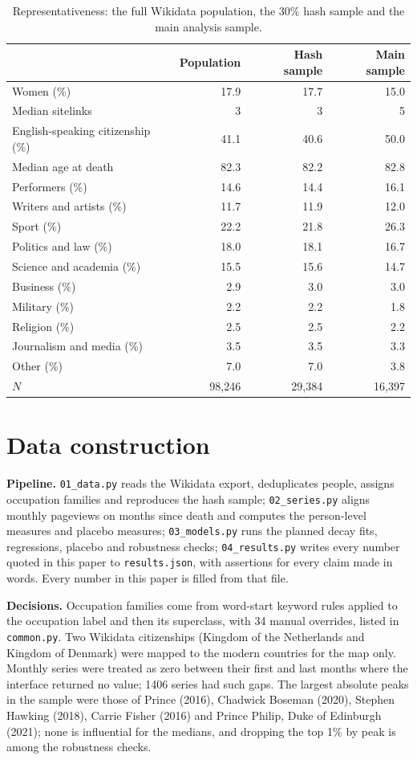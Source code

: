 \documentclass[11pt,a4paper]{article}
\begin{document}
\begin{table}[tbp]\centering\small\caption{Representativeness: the full Wikidata population, the 30\% hash sample and the main analysis sample.}\label{tab:rep}\begin{tabular}{lrrr}\toprule & Population & Hash sample & Main sample\\\midrule
Women (\%) & 17.9 & 17.7 & 15.0\\
Median sitelinks & 3 & 3 & 5\\
English-speaking citizenship (\%) & 41.1 & 40.6 & 50.0\\
Median age at death & 82.3 & 82.2 & 82.8\\
Performers (\%) & 14.6 & 14.4 & 16.1\\
Writers and artists (\%) & 11.7 & 11.9 & 12.0\\
Sport (\%) & 22.2 & 21.8 & 26.3\\
Politics and law (\%) & 18.0 & 18.1 & 16.7\\
Science and academia (\%) & 15.5 & 15.6 & 14.7\\
Business (\%) & 2.9 & 3.0 & 3.0\\
Military (\%) & 2.2 & 2.2 & 1.8\\
Religion (\%) & 2.5 & 2.5 & 2.2\\
Journalism and media (\%) & 3.5 & 3.5 & 3.3\\
Other (\%) & 7.0 & 7.0 & 3.8\\
$N$ & 98,246 & 29,384 & 16,397\\
\bottomrule\end{tabular}\end{table}

\section{Data construction}
\textbf{Pipeline.} \texttt{01\_data.py} reads the Wikidata export, deduplicates people, assigns occupation families and reproduces the hash sample; \texttt{02\_series.py} aligns monthly pageviews on months since death and computes the person-level measures and placebo measures; \texttt{03\_models.py} runs the planned decay fits, regressions, placebo and robustness checks; \texttt{04\_results.py} writes every number quoted in this paper to \texttt{results.json}, with assertions for every claim made in words. Every number in this paper is filled from that file.

\textbf{Decisions.} Occupation families come from word-start keyword rules applied to the occupation label and then its superclass, with 34 manual overrides, listed in \texttt{common.py}. Two Wikidata citizenships (Kingdom of the Netherlands and Kingdom of Denmark) were mapped to the modern countries for the map only. Monthly series were treated as zero between their first and last months where the interface returned no value; 1406 series had such gaps. The largest absolute peaks in the sample were those of Prince (2016), Chadwick Boseman (2020), Stephen Hawking (2018), Carrie Fisher (2016) and Prince Philip, Duke of Edinburgh (2021); none is influential for the medians, and dropping the top 1\% by peak is among the robustness checks.
\end{document}
